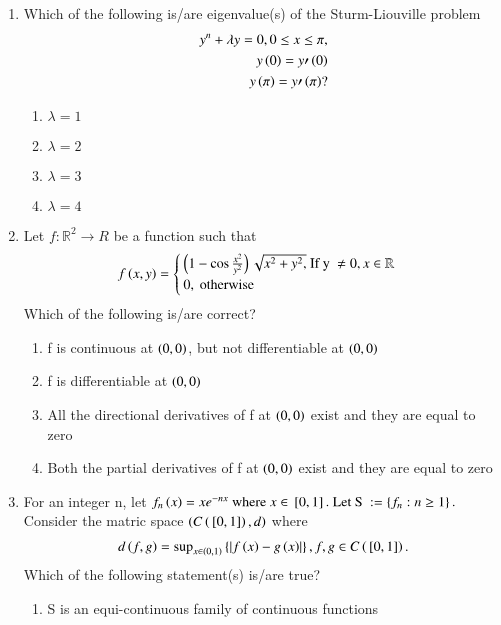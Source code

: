\documentclass[journal]{IEEEtran}
\begin{document}
\begin{enumerate} [start=53]
\item Which of the following is/are eigenvalue(s) of the Sturm-Liouville problem 
\begin{align*}
    y^{n}+\lambda y=0, 0\leq x\leq \pi,\\
    y\left(0\right)=y\prime\left(0\right)\\
    y\left(\pi\right)=y\prime\left(\pi\right)?
\end{align*}
\begin{enumerate}
    \item $\lambda=1$
    \item $\lambda=2$
    \item $\lambda=3$
    \item $\lambda=4$
\end{enumerate}
\bigskip
\item Let $f:\mathbb{R}^{2}\to R$ be a function such that 
\begin{align*}
    f\left(x,y\right)=
    \begin{cases}
        \left(1-\cos\frac{x^{2}}{y^{2}}\right)\sqrt{x^{2}+y^{2},} \text{ If y }\neq 0,x\in\mathbb{R}\\
        0, \text{ otherwise }
    \end{cases}
\end{align*}
Which of the following is/are correct?
\begin{enumerate}
    \item f is continuous at $\left(0, 0\right)$, but not differentiable at $\left(0, 0\right)$
    \item f is differentiable at $\left(0, 0\right)$
    \item All the directional derivatives of f at $\left(0, 0\right)$ exist and they are equal to zero
    \item Both the partial derivatives of f at $\left(0, 0\right)$ exist and they are equal to zero
\end{enumerate}
\bigskip
\item For an integer n, let $f_{n}\left(x\right)=xe^{-nx}\text{ where } x\in{}\left[0,1\right].\text{ Let S }:=\left\{f_{n}:n\geq1\right\}.$ Consider the matric space $\left(C\left({}\left[0,1\right]\right),d\right) $ where 
\begin{align*}
    d\left(f,g\right)=\text{sup}_{x\in\left(0,1\right)}\left\{\left\vert f\left(x\right)-g\left(x\right)\right\vert\right\}, f,g\in C\left({}\left[0,1\right]\right).
\end{align*}
Which of the following statement(s) is/are true?
\begin{enumerate}
    \item S is an equi-continuous family of continuous functions

\end{enumerate}
\end{enumerate}
\end{document}
